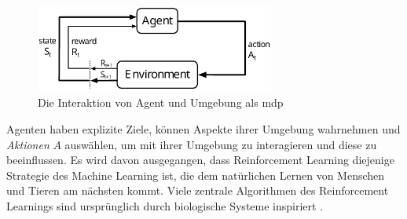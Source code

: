 \begin{figure}
    \centering
    \includegraphics[width = 0.7\textwidth]{Bilder/MDP.pdf}
    \caption{Die Interaktion von Agent und Umgebung als \ac{mdp} \cite[48]{sutton2018rlintro}}
    \label{fig:mdp}
\end{figure}

Agenten haben explizite Ziele, können Aspekte ihrer Umgebung wahrnehmen und \emph{Aktionen} $A$ auswählen, um mit ihrer Umgebung zu interagieren und diese zu beeinflussen.
Es wird davon ausgegangen, dass Reinforcement Learning diejenige Strategie des Machine Learning ist, die dem natürlichen Lernen von Menschen und Tieren am nächsten kommt.
Viele zentrale Algorithmen des Reinforcement Learnings sind ursprünglich durch biologische Systeme inspiriert \cite[4]{sutton2018rlintro}.

